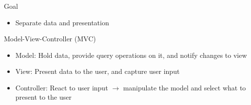 \begin{frame}
    \frametitle{\insertsubsection{}}
    \begin{fancycolumns}[widths={45,55}]
        \begin{motivation}{Goal}
            \begin{itemize}
                \item Separate data and presentation
            \end{itemize}
        \end{motivation}
        \begin{definition}{Model-View-Controller (MVC)}
            \begin{itemize}
                \item Model: Hold data, provide query operations on it, and notify changes to view
                \item View: Present data to the user, and capture user input
                \item Controller: React to user input $\rightarrow$ manipulate the model and select what to present to the user
            \end{itemize}
        \end{definition}
        \nextcolumn
        \mvcdefault{}
    \end{fancycolumns}
\end{frame}

